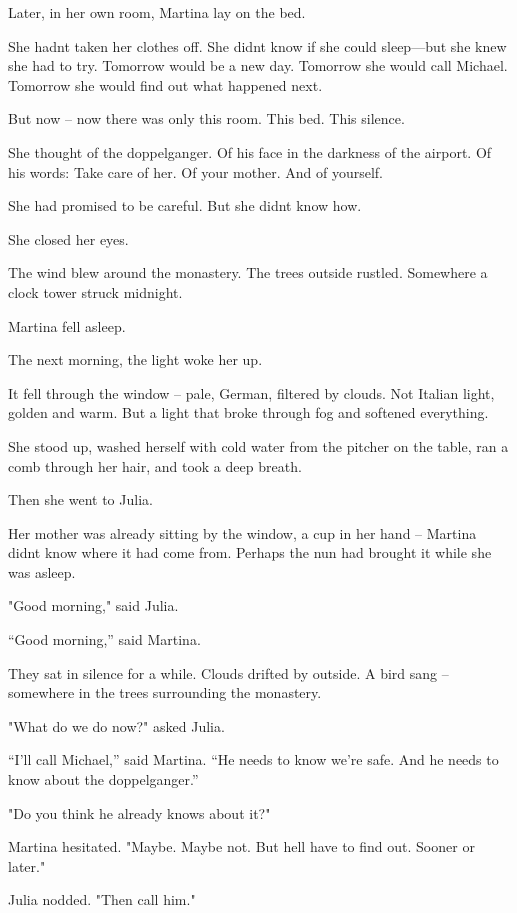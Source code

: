 \documentclass[
]{article}
\begin{document}
Later, in her own room, Martina lay on the bed.

She hadn\textquotesingle t taken her clothes off. She didn\textquotesingle t know if she could sleep---but she knew she had to try. Tomorrow would be a new day. Tomorrow she would call Michael. Tomorrow she would find out what happened next.

But now -- now there was only this room. This bed. This silence.

She thought of the doppelganger. Of his face in the darkness of the airport. Of his words: Take care of her. Of your mother. And of yourself.

She had promised to be careful. But she didn\textquotesingle t know how.

She closed her eyes.

The wind blew around the monastery. The trees outside rustled. Somewhere a clock tower struck midnight.

Martina fell asleep.

The next morning, the light woke her up.

It fell through the window -- pale, German, filtered by clouds. Not Italian light, golden and warm. But a light that broke through fog and softened everything.

She stood up, washed herself with cold water from the pitcher on the table, ran a comb through her hair, and took a deep breath.

Then she went to Julia.

Her mother was already sitting by the window, a cup in her hand -- Martina didn\textquotesingle t know where it had come from. Perhaps the nun had brought it while she was asleep.

"Good morning," said Julia.

``Good morning,'' said Martina.

They sat in silence for a while. Clouds drifted by outside. A bird sang -- somewhere in the trees surrounding the monastery.

"What do we do now?" asked Julia.

``I'll call Michael,'' said Martina. ``He needs to know we're safe. And he needs to know about the doppelganger.''

"Do you think he already knows about it?"

Martina hesitated. "Maybe. Maybe not. But he\textquotesingle ll have to find out. Sooner or later."

Julia nodded. "Then call him."
\end{document}
